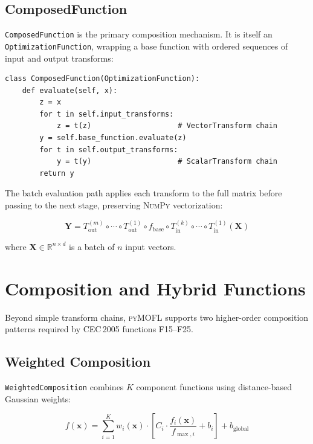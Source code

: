 \documentclass[11pt,a4paper]{article}
\newcommand{\pymofl}{\textsc{pyMOFL}}
\newcommand{\numpy}{\textsc{NumPy}}
\newcommand{\R}{\mathbb{R}}
\begin{document}
\subsection{ComposedFunction}

\texttt{ComposedFunction} is the primary composition mechanism. It is itself an
\texttt{OptimizationFunction}, wrapping a base function with ordered sequences
of input and output transforms:

\begin{lstlisting}[caption={ComposedFunction evaluation flow.},label=lst:composed]
class ComposedFunction(OptimizationFunction):
    def evaluate(self, x):
        z = x
        for t in self.input_transforms:
            z = t(z)                    # VectorTransform chain
        y = self.base_function.evaluate(z)
        for t in self.output_transforms:
            y = t(y)                    # ScalarTransform chain
        return y
\end{lstlisting}

The batch evaluation path applies each transform to the full matrix before
passing to the next stage, preserving \numpy{} vectorization:

\begin{equation}
\mathbf{Y} = T_{\text{out}}^{(m)} \circ \cdots \circ T_{\text{out}}^{(1)} \circ
f_{\text{base}} \circ
T_{\text{in}}^{(k)} \circ \cdots \circ T_{\text{in}}^{(1)}(\mathbf{X})
\label{eq:batch}
\end{equation}

\noindent where $\mathbf{X} \in \R^{n \times d}$ is a batch of $n$ input vectors.

\section{Composition and Hybrid Functions}\label{sec:compositions}

Beyond simple transform chains, \pymofl{} supports two higher-order
composition patterns required by CEC\,2005 functions F15--F25.

\subsection{Weighted Composition}

\texttt{WeightedComposition} combines $K$ component functions using
distance-based Gaussian weights:

\begin{equation}
f(\mathbf{x}) = \sum_{i=1}^{K} w_i(\mathbf{x}) \cdot \left[
  C_i \cdot \frac{f_i(\mathbf{x})}{f_{\max,i}} + b_i
\right] + b_{\text{global}}
\label{eq:weighted}
\end{equation}
\end{document}
